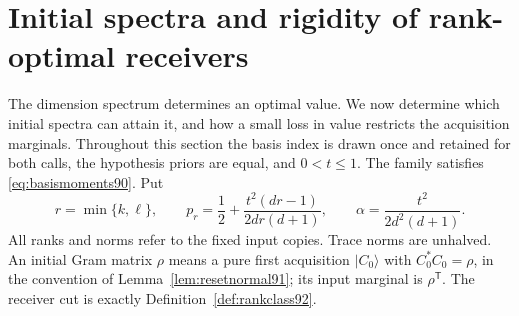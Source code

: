 \section{Initial spectra and rigidity of rank-optimal receivers}
\label{sec:spectralrigidity93}
The dimension spectrum determines an optimal value.  We now determine
which initial spectra can attain it, and how a small loss in value
restricts the acquisition marginals.  Throughout this section the basis
index is drawn once and retained for both calls, the hypothesis priors
are equal, and $0<t\le1$.  The family satisfies
\eqref{eq:basismoments90}.  Put
\[
 r=\min\{k,\ell\},\qquad
 p_r=\frac12+\frac{t^2(dr-1)}{2dr(d+1)},\qquad
 \alpha=\frac{t^2}{2d^2(d+1)}.
\]
All ranks and norms refer to the fixed input copies.  Trace norms are
unhalved.  An initial Gram matrix $\rho$ means a pure first acquisition
$|C_0\rangle$ with $C_0^*C_0=\rho$, in the convention of
Lemma~\ref{lem:resetnormal91}; its input marginal is $\rho^{\mathsf T}$.
The receiver cut is exactly Definition~\ref{def:rankclass92}.

